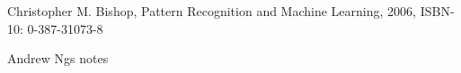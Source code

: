 \documentclass[11.5pt]{article}
\begin{document}
%	







\newpage

\begin{thebibliography}{9}
	Christopher M. Bishop, Pattern Recognition and Machine Learning, 2006, ISBN-10: 0-387-31073-8	

	Andrew Ngs notes

	
%	
%	
	
	
\end{thebibliography}


\newpage


\end{document}
